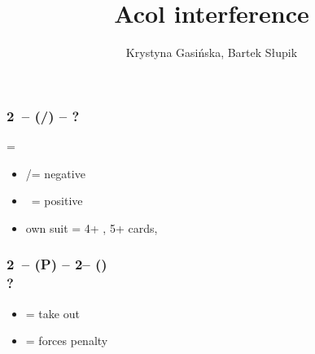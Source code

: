 \documentclass[12pt, a4paper]{article}
\title{Acol interference}
\author{Krystyna Gasińska, Bartek Słupik}
\begin{document}
\maketitle


\subsubsection*{2\clubs\ -- (\dbl/) -- ?}
\dbl = \clubs
\begin{itemize}
    \item \rdbl/\dbl = negative
    \item \pass\ = positive
    \item own suit = 4+ \hcp, 5+ cards, \gf
\end{itemize}

\subsubsection*{2\clubs\ -- (P) -- 2\diams -- ()
                \\ ?}
\begin{itemize}
    \item \dbl = take out \imp
    \item \pass = forces penalty \dbl
\end{itemize}

\end{document}
